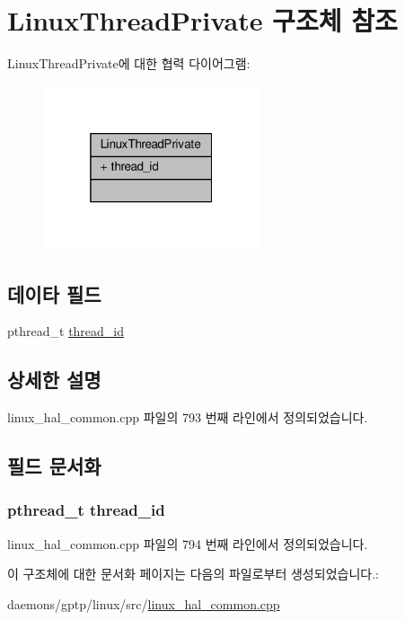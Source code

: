 \hypertarget{struct_linux_thread_private}{}\section{Linux\+Thread\+Private 구조체 참조}
\label{struct_linux_thread_private}


Linux\+Thread\+Private에 대한 협력 다이어그램\+:
\nopagebreak
\begin{figure}[H]
\begin{center}
\leavevmode
\includegraphics[width=181pt]{struct_linux_thread_private__coll__graph}
\end{center}
\end{figure}
\subsection*{데이타 필드}
\begin{DoxyCompactItemize}
\item 
pthread\+\_\+t \hyperlink{struct_linux_thread_private_a614409619094fd8c0c6b522c400ffeea}{thread\+\_\+id}
\end{DoxyCompactItemize}


\subsection{상세한 설명}


linux\+\_\+hal\+\_\+common.\+cpp 파일의 793 번째 라인에서 정의되었습니다.



\subsection{필드 문서화}
\subsubsection[{\texorpdfstring{thread\+\_\+id}{thread_id}}]{\setlength{\rightskip}{0pt plus 5cm}pthread\+\_\+t thread\+\_\+id}\hypertarget{struct_linux_thread_private_a614409619094fd8c0c6b522c400ffeea}{}\label{struct_linux_thread_private_a614409619094fd8c0c6b522c400ffeea}


linux\+\_\+hal\+\_\+common.\+cpp 파일의 794 번째 라인에서 정의되었습니다.



이 구조체에 대한 문서화 페이지는 다음의 파일로부터 생성되었습니다.\+:\begin{DoxyCompactItemize}
\item 
daemons/gptp/linux/src/\hyperlink{linux__hal__common_8cpp}{linux\+\_\+hal\+\_\+common.\+cpp}\end{DoxyCompactItemize}
